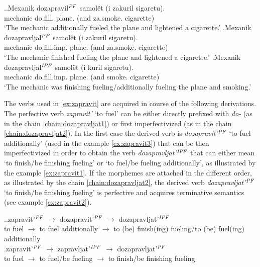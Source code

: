 \ex.\label{ex:zapravit}\ag.\label{ex:zapravit3}Mexanik dozapravil$^{\mathit{PF}}$ samol\"et (i zakuril sigaretu).\\
mechanic do.fill. plane. (and za.smoke. cigarette)\\
\vspace{0.5em}
`The mechanic additionally fueled the plane and lightened a cigarette.'
\bg.\label{ex:zapravit2}Mexanik dozapravljal$^{\mathit{PF}}$ samol\"et (i zakuril sigaretu).\\
mechanic do.fill.imp. plane. (and za.smoke. cigarette)\\
\vspace{0.5em}
`The mechanic finished fueling the plane and lightened a cigarette.'
\bg.\label{ex:zapravit1}Mexanik dozapravljal$^{\mathit{IPF}}$ samol\"et (i kuril sigaretu).\\
mechanic do.fill.imp. plane. (and smoke. cigarette)\\
\vspace{0.5em}
`The mechanic was finishing fueling/additionally fueling the plane and smoking.'

The verbs used in \ref{ex:zapravit} are acquired in course of the following derivations. The perfective verb \textit{zapravit'} `to fuel' can be either directly prefixed with \textit{do-} (as in the chain \ref{chain:dozapravljat1}) or first imperfectivized (as in the chain \ref{chain:dozapravljat2}). In the first case the derived verb is \textit{dozapravit'}$^{\mathit{PF}}$ `to fuel additionally' (used in the example \ref{ex:zapravit3}) that can be then imperfectivized in order to obtain the verb \textit{dozapravljat'}$^{\mathit{IPF}}$ that can either mean `to finish/be finishing fueling' or `to fuel/be fueling additionally', as illustrated by the example \ref{ex:zapravit1}. If the morphemes are attached in the different order, as illustrated by the chain \ref{chain:dozapravljat2}, the derived verb \textit{dozapravljat'}$^{\mathit{PF}}$ `to finish/be finishing fueling' is perfective and acquires terminative semantics (see example \ref{ex:zapravit2}).

\ex.\label{chain:dozapravljat}\ag.\label{chain:dozapravljat1}zapravit'$^{\mathit{PF}}$ $\rightarrow$ dozapravit'$^{\mathit{PF}}$ $\rightarrow$ dozapravljat'$^{\mathit{IPF}}$\\
{to fuel} $\rightarrow$ {to fuel additionally} $\rightarrow$ {to (be) finish(ing) fueling/to (be) fuel(ing) additionally}\\
\bg.\label{chain:dozapravljat2}zapravit'$^{\mathit{PF}}$ $\rightarrow$ zapravljat'$^{\mathit{IPF}}$ $\rightarrow$ dozapravljat'$^{\mathit{PF}}$\\
{to fuel} $\rightarrow$ {to fuel/be fueling} $\rightarrow$ {to finish/be finishing fueling}\\


